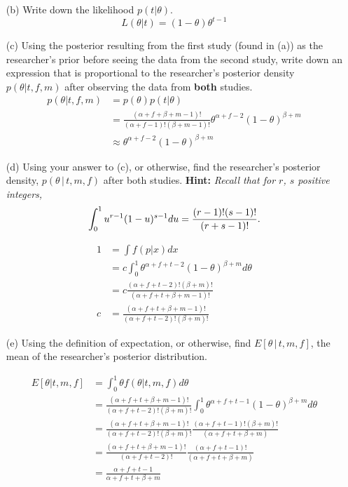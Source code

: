 \documentclass{article}
\newcommand{\1}{\mathbf{1}}
\begin{document}
\begin{enumerate}
    \item[(b)] Write down the likelihood $p(t | \theta)$.
    $$L(\theta | t) = (1-\theta)\theta^{t-1}$$

    \item[(c)] Using the posterior  resulting from the first study (found in (a)) as the researcher's prior  before seeing the data from the second study, write down an expression that is proportional to the researcher's posterior density $p(\theta | t, f,m)$ after observing the data from {\bf both} studies.
    \begin{align*}
        p(\theta | t, f, m) &= p(\theta) p(t|\theta) \\
        &= \frac{(\alpha+f+\beta + m -1)!}{(\alpha + f -1)!(\beta + m -1)!}\theta^{\alpha + f - 2}(1-\theta)^{\beta + m} \\
        &\approx \theta^{\alpha + f - 2 }(1-\theta)^{\beta + m}
    \end{align*}
    
    \item[(d)] Using your answer to (c), or otherwise, find the researcher's posterior density,  $p(\theta \,|\, t, m,f)$ after both studies.
    {\bf Hint:} {\it  Recall that for $r$, $s$ positive integers,
    $$ \int_0^1 u^{r-1}(1-u)^{s-1}du  = {{(r-1)!(s-1)!}\over {(r+s-1)!}}.  $$}
    
    \begin{align*}
        1 &= \int f(p|x) dx \\
        &= c\int_0^1 \theta^{\alpha+f+t-2}(1-\theta)^{\beta + m}d\theta \\
        &= c \frac{(\alpha + f + t -2)! (\beta+m)!}{(\alpha + f + t + \beta + m -1)!} \\
        c &= \frac{(\alpha + f + t + \beta + m -1)!}{(\alpha + f + t -2)! (\beta+m)!}
    \end{align*}
    
    \item[(e)] Using the definition of expectation, or otherwise, find $E[\theta \,|\, t, m, f]$, the mean of the researcher's posterior distribution.
    
    \begin{align*}
        E[\theta | t, m, f] &= \int_0^1 \theta f(\theta| t, m, f) d\theta \\
        &= \frac{(\alpha + f + t + \beta + m -1)!}{(\alpha + f + t -2)! (\beta+m)!} \int_0^1 \theta^{\alpha + f + t -1}(1-\theta)^{\beta+m} d\theta \\
        &= \frac{(\alpha + f + t + \beta + m -1)!}{(\alpha + f + t -2)! (\beta+m)!}  \frac{(\alpha + f + t -1)!(\beta+m)!}{(\alpha + f + t +\beta + m)} \\
        &= \frac{(\alpha + f + t + \beta + m -1)!}{(\alpha + f + t -2)!}  \frac{(\alpha + f + t -1)!}{(\alpha + f + t +\beta + m)} \\
        &= \frac{\alpha + f + t -1}{\alpha + f + t +\beta + m}
    \end{align*}


\end{enumerate}
\end{document}
